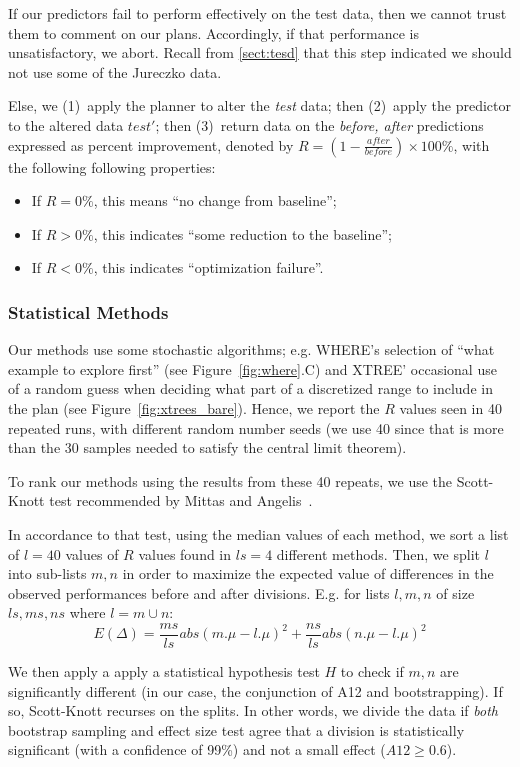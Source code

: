 \documentclass{sig-alternate}
\newcommand{\bi}{\begin{itemize}}
\newcommand{\ei}{\end{itemize}}
\newcommand{\tion}[1]{\textsection\ref{sect:#1}}
\newcommand{\fig}[1]{Figure~\ref{fig:#1}}
\begin{document}
If our { predictors} fail to perform effectively on the test data,
then we cannot trust them to comment on our plans. Accordingly,
if that performance is unsatisfactory, we abort. Recall from \tion{tesd} that this step indicated
we should not use some of the  Jureczko data.

Else, we (1)~apply the { planner} to alter the {\em test} data;
then (2)~apply the { predictor} to the altered data $test'$;
then (3)~return data on the {\em before, after} predictions expressed as percent improvement, denoted by  $R=(1-\frac{\mathit{after}}{\mathit{before}})\times100\%$, with the following following properties:
\bi
\item If $R  = 0\%$, this means  ``no change from baseline''; 
\item If $R \gt 0\%$, this indicates ``some reduction to the baseline'';
\item If $R \lt 0\%$, this indicates ``optimization failure''.
\ei
 \subsubsection{Statistical Methods}
 Our methods use some stochastic algorithms; e.g. WHERE's selection of ``what example to explore first'' (see \fig{where}.C) and
  XTREE' occasional use of a random guess when deciding what part of a discretized range to include in the plan
  (see \fig{xtrees_bare}). Hence, we report the $R$ values seen in 40 repeated runs,
  with different random number seeds
(we use 40 since that is  more than the 30 samples  needed
to satisfy the central limit theorem).

  To rank our methods using the results from these 40
  repeats, we use the Scott-Knott test recommended by Mittas and  Angelis~\cite{mittas13}. 

In accordance to that test, using the median values of each method, we
sort a list of  $l=40$ values of $R$ values found in  $ls=4$ different methods. 
Then, we
split $l$ into sub-lists $m,n$ in order to maximize the expected value of
 differences  in the observed performances
before and after divisions. E.g. for lists $l,m,n$ of size $ls,ms,ns$ where $l=m\cup n$:
 \[E(\Delta)=\frac{ms}{ls}abs(m.\mu - l.\mu)^2 + \frac{ns}{ls}abs(n.\mu - l.\mu)^2\]

We then apply a apply a statistical hypothesis test $H$ to check
if $m,n$ are significantly different  (in our case, the conjunction of A12 and bootstrapping). 
If so, Scott-Knott  recurses on the splits.
In other words, we divide the data if \textit{both} bootstrap sampling and effect size test agree that a division is statistically significant (with a confidence of 99\%) and not a small effect ($A12 \ge 0.6$).
\end{document}
